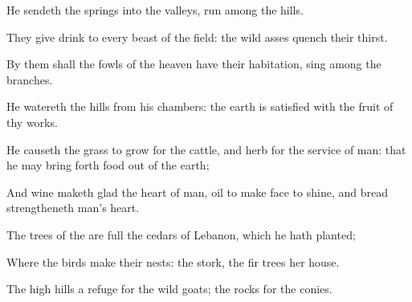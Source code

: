 {\Q {}He
sendeth the
springs into the
valleys,
{}
run among the
hills.


\par }{\Q {}They give
drink to every
beast of the
field: the wild
asses
quench their
thirst.


\par }{\Q {}By them shall the
fowls of the
heaven have their
habitation,
{}
sing
among the
branches.


\par }{\Q {}He
watereth the
hills from his
chambers: the
earth is
satisfied with the
fruit of thy
works.


\par }{\Q {}He causeth the
grass to
grow for the
cattle, and
herb for the
service of
man: that he may bring
forth
food out of the
earth;


\par }{\Q {}And
wine
{} maketh
glad the
heart of
man,
{}
oil to make
{}
face to
shine, and
bread
{}
strengtheneth
man’s
heart.


\par }{\Q {}The
trees of the
{} are
full
{} the
cedars of
Lebanon, which he hath
planted;


\par }{\Q {}Where the
birds make their
nests:
{} the
stork, the fir
trees
{} her
house.


\par }{\Q {}The
high
hills
{} a
refuge for the wild
goats;
{} the
rocks for the
conies.


\par }{\BB \par }
